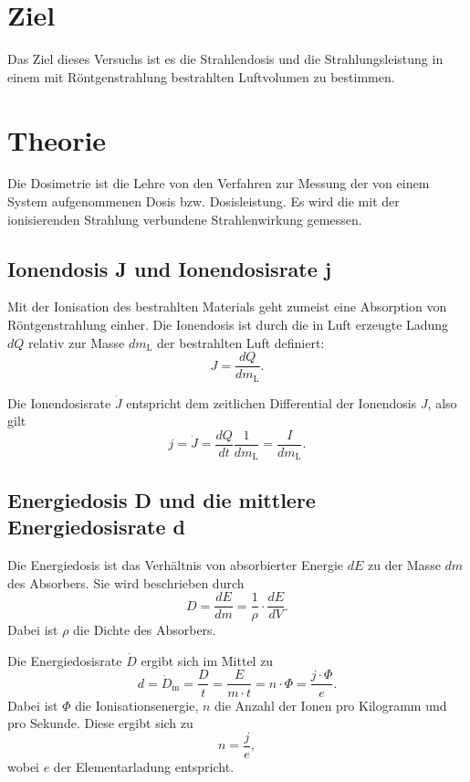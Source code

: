\section{Ziel}
Das Ziel dieses Versuchs ist es die Strahlendosis und die
Strahlungsleistung in einem mit Röntgenstrahlung bestrahlten
Luftvolumen zu bestimmen.

\section{Theorie}
\label{sec:Theorie}

Die Dosimetrie ist die Lehre von den Verfahren zur Messung 
der von einem System aufgenommenen Dosis bzw. Dosisleistung.
Es wird die mit der ionisierenden Strahlung
verbundene Strahlenwirkung gemessen.


\subsection{Ionendosis J und Ionendosisrate j}
Mit der Ionisation des bestrahlten Materials geht zumeist
eine Absorption von Röntgenstrahlung einher. %
Die Ionendosis ist durch die in Luft erzeugte Ladung $dQ$
relativ zur Masse $dm_\text{L}$ der bestrahlten Luft definiert:
\begin{equation*}
    J = \frac{dQ}{dm_\text{L}}.
    \label{eqn:Ionendosis}
\end{equation*}

\noindent Die Ionendosisrate $\dot{J}$ entspricht dem zeitlichen Differential der Ionendosis $J$, also gilt 
\begin{equation}
    j = \dot{J} =\frac{dQ}{dt} \frac{1}{dm_\text{L}} =\frac{I}{dm_\text{L}}.
    \label{eqn:Ionendosisrate}
\end{equation}

\subsection{Energiedosis D und die mittlere Energiedosisrate d}
Die Energiedosis ist das Verhältnis von absorbierter
Energie $dE$ zu der Masse $dm$ des Absorbers.
Sie wird beschrieben durch
\begin{equation*}
    D = \frac{dE}{dm} = \frac{1}{\rho} \cdot \frac{dE}{dV}.
    \label{eqn:Energiedosis}
\end{equation*}
Dabei ist $\rho$ die Dichte des Absorbers.

\noindent Die Energiedosisrate $\dot{D}$ ergibt sich im Mittel zu 
\begin{equation}
    d = \dot{D}_\text{m} = \frac{D}{t} =\frac{E}{m \cdot t} = n \cdot \Phi = \frac{j \cdot \Phi}{e}.
    \label{eqn:Energiedosisrate}
\end{equation}
Dabei ist $\Phi$ die Ionisationsenergie, $n$ die Anzahl der Ionen pro Kilogramm und pro Sekunde. 
Diese ergibt sich zu
\begin{equation*}
    n = \frac{j}{e},
    \label{eqn:Ionenanzahl}
\end{equation*}
wobei $e$ der Elementarladung entspricht. 

